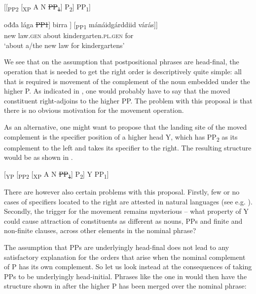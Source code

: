\documentclass[output=paper]{LSP/langsci}
\begin{document}
\ea%
    \label{ex:julien:9}
   
\ea{}
[[\textsubscript{PP2} [\textsubscript{XP} A N \sout{PP\textsubscript{1}}] P\textsubscript{2}] PP\textsubscript{1}]

\ex
\gll\relax  {[[\textsubscript{PP2} [\textsubscript{XP}}  ođđa  lága    \st{PP1}]  birra {]  [\textsubscript{PP1}}  mánáidgárddiid      várás]]\\
          {} new  law.\textsc{gen} {}    about   {}     kindergarten.\textsc{pl}.\textsc{gen}    for\\

\glt     ‘about a/the new law for kindergartens’
\z
\z

We see that on the assumption that  postpositional phrases are head-final, the operation that is needed to get the right order is descriptively quite simple: all that is required is movement of the complement of the noun embedded under the higher P. As indicated in , one would probably have to say that the moved constituent right-adjoins to the higher PP. The problem with this proposal is that there is no obvious motivation for the movement operation.


As an alternative, one might want to propose that the landing site of the moved complement is the specifier position of a higher head Y, which has PP\textsubscript{2} as its complement to the left and takes its specifier to the right. The resulting structure would be as shown in .


\ea%
    \label{ex:julien:10}
 	  [\textsubscript{YP} [\textsubscript{PP2} [\textsubscript{XP} A N \sout{PP\textsubscript{1}}]  P\textsubscript{2}] Y PP\textsubscript{1}]
\z

There are however also certain problems with this proposal. Firstly, few or no cases of specifiers located to the right are attested in natural languages (see e.g. \citealt{Kayne1994}). Secondly, the trigger for the movement remains mysterious – what property of Y could cause attraction of constituents as different as nouns, PPs and finite and non-finite clauses, across other elements in the nominal phrase?


The assumption that  PPs are underlyingly head-final does not lead to any satisfactory explanation for the orders that arise when the nominal complement of P has its own complement. So let us look instead at the consequences of taking  PPs to be underlyingly head-initial. Phrases like the one in  would then have the structure shown in  after the higher P has been merged over the nominal phrase:
\end{document}
